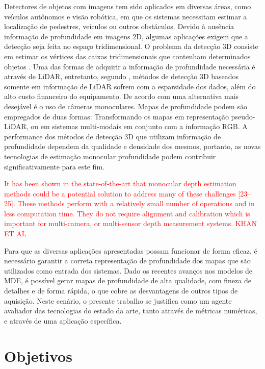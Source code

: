 Detectores de objetos com imagens tem sido aplicados em diversas áreas, como veículos autônomos e visão robótica, em que os sistemas necessitam estimar a localização de pedestres, veículos ou outros obstáculos. Devido à ausência informação de profundidade em imagens 2D, algumas aplicações exigem que a detecção seja feita no espaço tridimensional. O problema da detecção 3D consiste em estimar os vértices das caixas tridimensionais que contenham determinados objetos \cite{hu2022detection}. Uma das formas de adquirir a informação de profundidade necessária é através de LiDAR, entretanto, segundo , métodos de detecção 3D baseados somente em informação de LiDAR sofrem com a esparsidade dos dados, além do alto custo financeiro do equipamento. De acordo com  uma alternativa mais desejável é o uso de câmeras monoculares. Mapas de profundidade podem são empregados de duas formas: Transformando os mapas em representação pseudo-LiDAR, ou em sistemas multi-modais em conjunto com a informação RGB. A performance dos métodos de detecção 3D que utilizam informação de profundidade dependem da qualidade e densidade dos mesmos, portanto, as novas tecnologias de estimação monocular profundidade podem contribuir significativamente para este fim.


\textcolor{red}{It has been shown in the state-of-the-art that monocular depth estimation methods could be
a potential solution to address many of these challenges [23–25]. These methods perform with a
relatively small number of operations and in less computation time. They do not require alignment
and calibration which is important for multi-camera, or multi-sensor depth measurement systems. KHAN ET AL}


Para que as diversas aplicações apresentadas possam funcionar de forma eficaz, é necessário garantir a correta representação de profundidade dos mapas que são utilizados como entrada dos sistemas. Dado os recentes avanços nos modelos de MDE, é possível gerar mapas de profundidade de alta qualidade, com fineza de detalhes e de forma rápida, o que cobre as desvantagens de outros tipos de aquisição. Neste cenário, o presente trabalho se justifica como um agente avaliador das tecnologias do estado da arte, tanto através de métricas numéricas, e através de uma aplicação específica. 

 
\section{Objetivos}


